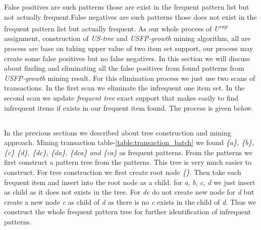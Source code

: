 %
False positives are such patterns those are exist in the frequent pattern list but not actually frequent.False negatives are such patterns those does not exist in the frequent pattern list but actually frequent. As our whole process of \emph{U\textsuperscript{cap}} assignment, construction of \emph{US-tree} and \emph{USFP-growth} mining algorithm, all are process are base on taking upper value of two item set support, our process may create some false positives but no false negatives. In this section we will discuss about finding and eliminating all the false positives from found patterns from \emph{USFP-growth} mining result. For this elimination process we just use two scans of transactions. In the first scan we eliminate the infrequent one item set. In the second scan we update \emph{frequent tree} exact support that makes easily to find infrequent items if exists in our frequent item found. The process is given below.
\subsection*{}
In the previous sections we described about tree construction and mining approach. Mining transaction table-\ref{table:transaction_batch} we found \emph{\{a\}, \{b\}, \{c\} \{d\}, \{dc\}, \{da\}, \{dca\} and \{ca\}} as frequent patterns. From the patterns we first construct a pattern tree from the patterns. This tree is very much easier to construct. For tree construction we first create root node \emph{\{\}}. Then take each frequent item and insert into the root node as a child. for \emph{a}, \emph{b}, \emph{c}, \emph{d} we just insert as child as it does not exists in the tree. For \emph{dc} do not create new node for \emph{d} but create a new node \emph{c} as child of \emph{d} as there is no \emph{c} exists in the child of \emph{d}. Thus we construct the whole frequent pattern tree for further identification of infrequent patterns. 
